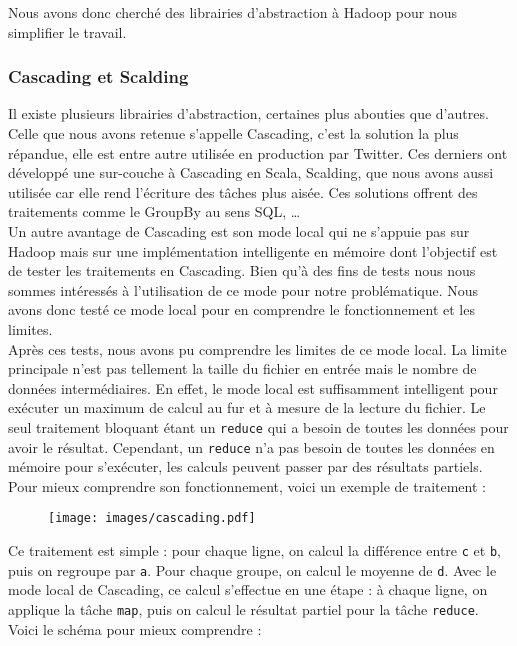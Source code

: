 Nous avons donc cherché des librairies d'abstraction à Hadoop pour nous simplifier le travail.

\subsubsection{Cascading et Scalding}

Il existe plusieurs librairies d'abstraction, certaines plus abouties que d'autres. Celle que nous avons retenue s'appelle Cascading, c'est la solution la plus répandue, elle est entre autre utilisée en production par Twitter. Ces derniers ont développé une sur-couche à Cascading en Scala, Scalding, que nous avons aussi utilisée car elle rend l'écriture des tâches plus aisée. Ces solutions offrent des traitements comme le GroupBy au sens SQL, \dots{}\\

Un autre avantage de Cascading est son mode local qui ne s'appuie pas sur Hadoop mais sur une implémentation intelligente en mémoire dont l'objectif est de tester les traitements en Cascading. Bien qu'à des fins de tests nous nous sommes intéressés à l'utilisation de ce mode pour notre problématique. Nous avons donc testé ce mode local pour en comprendre le fonctionnement et les limites.\\

Après ces tests, nous avons pu comprendre les limites de ce mode local. La limite principale n'est pas tellement la taille du fichier en entrée mais le nombre de données intermédiaires. En effet, le mode local est suffisamment intelligent pour exécuter un maximum de calcul au fur et à mesure de la lecture du fichier. Le seul traitement bloquant étant un \verb+reduce+ qui a besoin de toutes les données pour avoir le résultat. Cependant, un \verb+reduce+ n'a pas besoin de toutes les données en mémoire pour s'exécuter, les calculs peuvent passer par des résultats partiels.\\

Pour mieux comprendre son fonctionnement, voici un exemple de traitement :
\begin{figure}[H]
	\centering
	\texttt{[image: images/cascading.pdf]}
\end{figure}

Ce traitement est simple : pour chaque ligne, on calcul la différence entre \verb+c+ et \verb+b+, puis on regroupe par \verb+a+. Pour chaque groupe, on calcul le moyenne de \verb+d+. Avec le mode local de Cascading, ce calcul s'effectue en une étape : à chaque ligne, on applique la tâche \verb+map+, puis on calcul le résultat partiel pour la tâche \verb+reduce+. Voici le schéma pour mieux comprendre :

